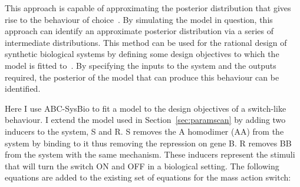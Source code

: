 This approach is capable of approximating the posterior distribution that gives rise to the behaviour of choice~\autocite{Toni:2009tr}. By simulating the model in question, this approach can identify an approximate posterior distribution via a series of intermediate distributions. This method can be used for the rational design of synthetic biological systems by defining some design objectives to which the model is fitted to~\autocite{Barnes:2011hh}. By specifying the inputs to the system and the outputs required, the posterior of the model that can produce this behaviour can be identified. 

Here I use ABC-SysBio to fit a model to the design objectives of a switch-like behaviour. I extend the model used in Section~\ref{sec:paramscan} by adding two inducers to the system, S and R. S removes the A homodimer (AA) from the system by binding to it thus removing the repression on gene B. R removes BB from the system with the same mechanism. These inducers represent the stimuli that will turn the switch ON and OFF in a biological setting. The following equations are added to the existing set of equations for the mass action switch: 

